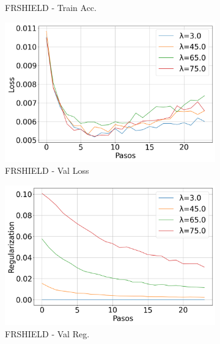 \begin{figure}[H]
\begin{subfigure}[b]{0.3\textwidth}
        \caption{FRSHIELD - Train Acc.}
    \end{subfigure}

    \vspace{0.5em}

    \begin{subfigure}[b]{0.3\textwidth}
        \includegraphics[width=\linewidth]{images/Val_Loss_evolucion_frshield.png}
        \caption{FRSHIELD - Val Loss}
    \end{subfigure}
    \hfill
    \begin{subfigure}[b]{0.3\textwidth}
        \includegraphics[width=\linewidth]{images/Val_Regularization_evolucion_frshield.png}
        \caption{FRSHIELD - Val Reg.}
    \end{subfigure}
    \hfill
    \begin{subfigure}[b]{0.3\textwidth}

\end{subfigure}
\end{figure}
